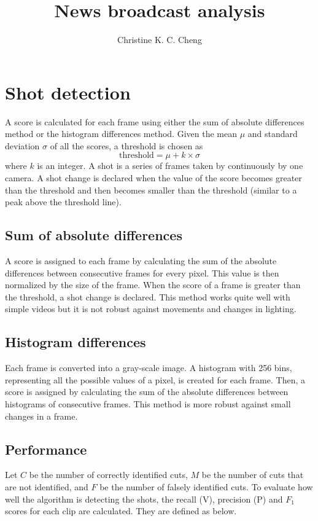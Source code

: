 \documentclass{article}
\title{News broadcast analysis}
\author{
	Christine K. C. Cheng
}
\begin{document}
\maketitle

\section{Shot detection}
A score is calculated for each frame using either the sum of absolute differences method or the histogram differences method. Given the mean $\mu$ and standard deviation $\sigma$ of all the scores, a threshold is chosen as $$\text{threshold} = \mu + k\times \sigma$$ where $k$ is an integer. A shot is a series of frames taken by continuously by one camera. A shot change is declared when the value of the score becomes greater than the threshold and then becomes smaller than the threshold (similar to a peak above the threshold line).

\subsection*{Sum of absolute differences}
A score is assigned to each frame by calculating the sum of the absolute differences between consecutive frames for every pixel. This value is then normalized by the size of the frame. When the score of a frame is greater than the threshold, a shot change is declared. This method works quite well with simple videos but it is not robust against movements and changes in lighting.

\subsection*{Histogram differences}
Each frame is converted into a gray-scale image. A histogram with 256 bins, representing all the possible values of a pixel, is created for each frame. Then, a score is assigned by calculating the sum of the absolute differences between histograms of consecutive frames. This method is more robust against small changes in a frame.

\subsection*{Performance}
Let $C$ be the number of correctly identified cuts, $M$ be the number of cuts that are not identified, and $F$ be the number of falsely identified cuts. To evaluate how well the algorithm is detecting the shots, the recall (V), precision (P) and $F_1$ scores for each clip are calculated. They are defined as below.
\end{document}
